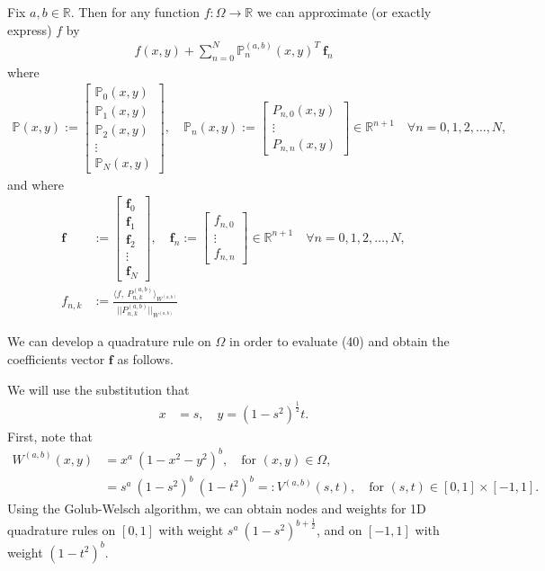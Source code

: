 \documentclass[11pt, oneside]{article}   	%
\newcommand{\sotodo}{\todo[color=green]}
\newcommand{\half}{\frac{1}{2}}
\newcommand{\R}{\mathbb{R}}
\newcommand{\bigP}{\mathbb{P}}
\newcommand{\Pnk}{P_{n,k}}
\begin{document}
Fix \(a,b \in \R\). Then for any function \(f : \Omega \to \R\) we can approximate (or exactly express) \(f\) by\sotodo{The $+$ should be $\approx$}
\begin{align}
f(x,y) + \sum_{n=0}^N \bigP_n^{(a,b)}(x,y)^T \: \mathbf{f}_n
\end{align}
where
\begin{align}
\bigP(x,y) := \begin{bmatrix}
		\bigP_0(x,y) \\
		\hline
		\bigP_1(x,y) \\
		\hline
		\bigP_2(x,y) \\
		\hline
		\vdots \\
		\hline
		\bigP_N(x,y)
	\end{bmatrix},
\quad
\bigP_n(x,y) := \begin{bmatrix}
		P_{n,0}(x,y) \\
		\vdots \\
		P_{n,n}(x,y)
	\end{bmatrix} \in \R^{n+1} \quad \forall n = 0,1,2,\dots,N,
\end{align}
and where
\begin{align}
\mathbf{f} &:= \begin{bmatrix}
		\mathbf{f}_0 \\
		\hline
		\mathbf{f}_1 \\
		\hline
		\mathbf{f}_2\\
		\hline
		\vdots \\
		\hline
		\mathbf{f}_N
	\end{bmatrix},
\quad
\mathbf{f}_n := \begin{bmatrix}
		f_{n,0} \\
		\vdots \\
		f_{n,n}
	\end{bmatrix} \in \R^{n+1} \quad \forall n = 0,1,2,\dots,N, \\
f_{n,k} &:= \frac{\langle f, \: \Pnk^{(a,b)} \rangle_{W^{(a,b)}}}{|| \Pnk^{(a,b)} ||_{W^{(a,b)}}}
\end{align}




We can develop a quadrature rule on \(\Omega\) in order to evaluate (40) and obtain the coefficients vector \(\mathbf{f}\) as follows. 

We will use the substitution that
\begin{align}
x &= s, \quad y = (1-s^2)^\half t.
\end{align}
First, note that
\begin{align}
W^{(a,b)}(x,y) &= x^a \: (1-x^2-y^2)^b, \quad \text{for } (x,y) \in \Omega, \\
		      &= s^a \: (1-s^2)^{b} \: (1-t^2)^b =: V^{(a,b)}(s,t), \quad \text{for } (s,t) \in [0,1] \times [-1,1].
\end{align}
Using the Golub-Welsch algorithm, we can obtain nodes and weights for 1D quadrature rules on \([0,1]\) with weight \(s^a \: (1-s^2)^{b+\half}\), and on \([-1,1]\) with weight \((1-t^2)^b\).
\end{document}
